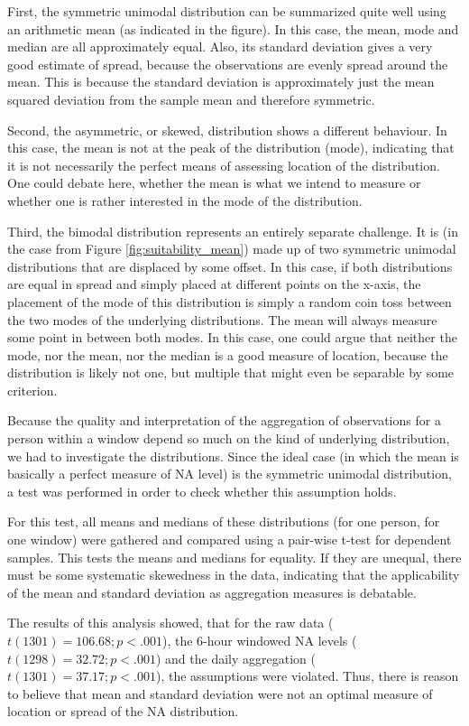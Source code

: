 First, the symmetric unimodal distribution can be summarized quite well using an arithmetic mean (as indicated in the figure). In this case, the mean, mode and median are all approximately equal. Also, its standard deviation gives a very good estimate of spread, because the observations are evenly spread around the mean. This is because the standard deviation is approximately just the mean squared deviation from the sample mean and therefore symmetric.

Second, the asymmetric, or skewed, distribution shows a different behaviour. In this case, the mean is not at the peak of the distribution (mode), indicating that it is not necessarily the perfect means of assessing location of the distribution. One could debate here, whether the mean is what we intend to measure or whether one is rather interested in the mode of the distribution.

Third, the bimodal distribution represents an entirely separate challenge. It is (in the case from Figure \ref{fig:suitability_mean}) made up of two symmetric unimodal distributions that are displaced by some offset. In this case, if both distributions are equal in spread and simply placed at different points on the x-axis, the placement of the mode of this distribution is simply a random coin toss between the two modes of the underlying distributions. The mean will always measure some point in between both modes. In this case, one could argue that neither the mode, nor the mean, nor the median is a good measure of location, because the distribution is likely not one, but multiple that might even be separable by some criterion.

Because the quality and interpretation of the aggregation of observations for a person within a window depend so much on the kind of underlying distribution, we had to investigate the distributions. Since the ideal case (in which the mean is basically a perfect measure of NA level) is the symmetric unimodal distribution, a test was performed in order to check whether this assumption holds. 

For this test, all means and medians of these distributions (for one person, for one window) were gathered and compared using a pair-wise t-test for dependent samples. This tests the means and medians for equality. If they are unequal, there must be some systematic skewedness in the data, indicating that the applicability of the mean and standard deviation as aggregation measures is debatable.

The results of this analysis showed, that for the raw data ($t(1301) = 106.68; p < .001$), the 6-hour windowed NA levels ($t(1298) = 32.72; p < .001$) and the daily aggregation ($t(1301) = 37.17; p < .001$), the assumptions were violated. Thus, there is reason to believe that mean and standard deviation were not an optimal measure of location or spread of the NA distribution. 

